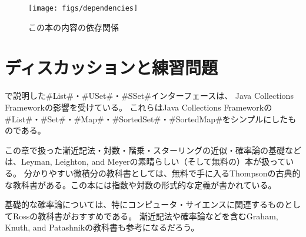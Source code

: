 \begin{figure}
  \begin{center}
    \texttt{[image: figs/dependencies]}
  \end{center}
  \caption{この本の内容の依存関係}
\end{figure}

\section{ディスカッションと練習問題}

で説明した#List#・#USet#・#SSet#インターフェースは、 Java Collections Framework\cite{oracle_collections}の影響を受けている。
%
これらはJava Collections Frameworkの#List#・#Set#・#Map#・#SortedSet#・#SortedMap#をシンプルにしたものである。

この章で扱った漸近記法・対数・階乗・スターリングの近似・確率論の基礎などは、Leyman, Leighton, and Meyer\cite{llm11}の素晴らしい（そして無料の）本が扱っている。
分かりやすい微積分の教科書としては、無料で手に入るThompson\cite{t14}の古典的な教科書がある。この本には指数や対数の形式的な定義が書かれている。

基礎的な確率論については、特にコンピュータ・サイエンスに関連するものとしてRoss\cite{r01}の教科書がおすすめである。
漸近記法や確率論などを含むGraham, Knuth, and Patashnik\cite{gkp94}の教科書も参考になるだろう。


